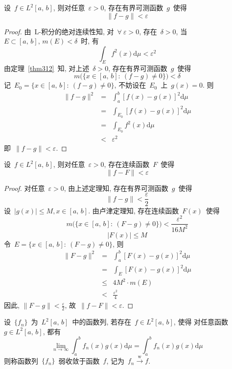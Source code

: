 \begin{Theorem}
设~$f\in L^2[a,\,b]$, 则对任意~$\varepsilon>0$, 存在有界可测函数~$g$~使得
\[
\|f-g\|<\varepsilon
\]
\end{Theorem}

\begin{proof}
由~L-积分的绝对连续性知, 对~$\forall~\varepsilon>0$, 存在~$\delta>0$, 当~$E\subset [a,\,b],\, m(E)<\delta$~时, 有
\[
\int_{E}f^{2}(x)\mathrm{d}\mu<\varepsilon^{2}
\]
由定理~\ref{thm312}~知, 对上述~$\delta>0$, 存在有界可测函数~$g$~使得
\[
m\big(\{x\in [a,\,b]:\: (f-g)\neq 0\}\big)<\delta
\]
记~$E_{0}=\{x\in [a,\,b]:\: (f-g)\neq 0\}$, 不妨设在~$E_0$~上~$g(x)=0$. 则
\begin{eqnarray*}
\|f-g\|^{2} &=&\int_{a}^{b}\left[f(x)-g(x)\right]^{2}\mathrm{d}\mu \\
&=&\int_{E_{0}}\left[f(x)-g(x)\right]^{2}\mathrm{d}\mu\\
&=&\int_{E_{0}}f^{2}(x)\mathrm{d}\mu\\
&<& \varepsilon^{2}
\end{eqnarray*}
即~$\|f-g\|<\varepsilon$.
\end{proof}


\begin{Theorem}
设~$f\in L^2[a,\,b]$, 则对任意~$\varepsilon>0$, 存在连续函数~$F$~使得
\[
\|f-F\|<\varepsilon
\]
\end{Theorem}

\begin{proof}
对任意~$\varepsilon>0$, 由上述定理知, 存在有界可测函数~$g$~使得
\[
\|f-g\|<\frac{\varepsilon}{2}
\]
设~$|g(x)|\leqslant M, x\in [a,\,b]$. 由卢津定理知, 存在连续函数~$F(x)$~使得
\[
m\big(\{x\in [a,\,b]:\: (F-g)\neq 0\}\big)<\frac{\varepsilon^{2}}{16M^{2}}
\]
\[
|F(x)|\leqslant M
\]
令~$E=\{x\in [a,\,b]:\: (F-g)\neq 0\}$, 则
\begin{eqnarray*}
\|F-g\|^{2}&=&\int_{a}^{b}\left[F(x)-g(x)\right]^{2}\mathrm{d}\mu\\
&=&\int_{E}\left[F(x)-g(x)\right]^{2}\mathrm{d}\mu\\
&\leqslant& 4M^{2}\cdot m\left(E\right)\\[0.1cm]
&<& \frac{\varepsilon^{2}}{4}
\end{eqnarray*}
因此, $\|F-g\|<\frac{\varepsilon}{2}$, 故~$\|f-F\|<\varepsilon$.
\end{proof}

\begin{Definition}\label{Def-6-5}

设~$\{f_n\}$~为~$L^2[a,\,b]$~中的函数列, 若存在~$f\in L^2[a,\,b]$, 使得
对任意函数~$g\in L^2[a,\,b]$, 都有
\[
\lim\limits_{n\rightarrow\infty}\int_{a}^{b}f_{n}(x)g(x)\mathrm{d}\mu=\int_{a}^{b}f_{n}(x)g(x)\mathrm{d}\mu
\]
则称函数列~$\{f_n\}$~弱收敛于函数~$f$, 记为~$f_n\xrightarrow{\mathrm{~w~}} f$.
\end{Definition}

